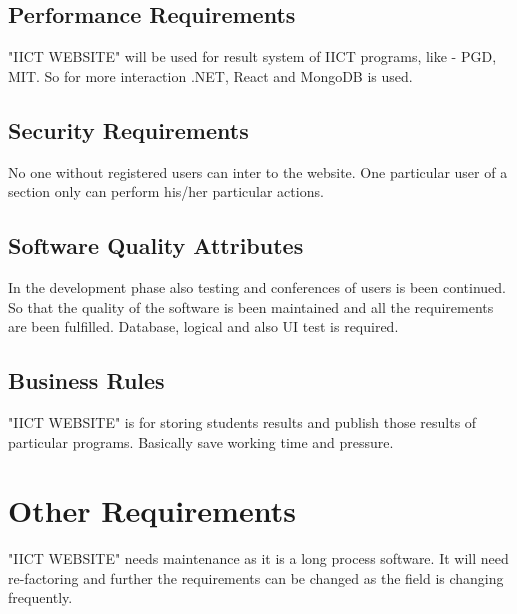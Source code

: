 \documentclass{scrreprt}
\begin{document}
    \section{Performance Requirements}
    "IICT WEBSITE" will be used for result system of IICT programs, like - PGD, MIT. So for more interaction .NET, React and MongoDB is used.

    \section{Security Requirements}
    No one without registered users can inter to the website. One particular user of a section only can perform his/her particular actions.

    \section{Software Quality Attributes}
    In the development phase also testing and conferences of users is been continued. So that the quality of the software is been maintained and all the requirements are been fulfilled.
    \newline
    Database, logical and also UI test is required.

    \section{Business Rules}
    "IICT WEBSITE" is for storing students results and publish those results of particular programs.
    \newline
    Basically save working time and pressure.


    \chapter{Other Requirements}
    "IICT WEBSITE" needs maintenance as it is a long process software. It will need re-factoring and further the requirements can be changed as the field is changing frequently.
\end{document}
